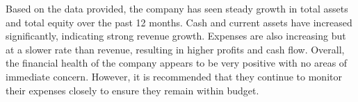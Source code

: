 

Based on the data provided, the company has seen steady growth in total assets and total equity over the past 12 months. Cash and current assets have increased significantly, indicating strong revenue growth. Expenses are also increasing but at a slower rate than revenue, resulting in higher profits and cash flow. Overall, the financial health of the company appears to be very positive with no areas of immediate concern. However, it is recommended that they continue to monitor their expenses closely to ensure they remain within budget.